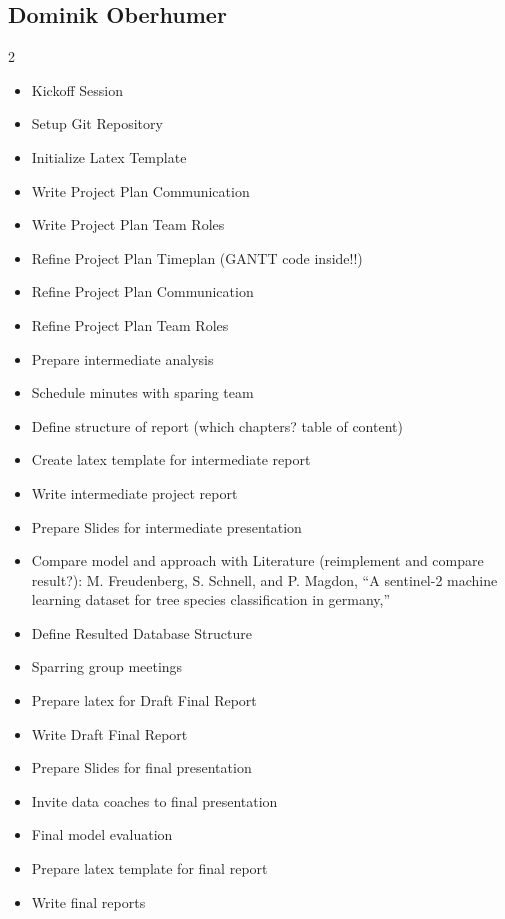 \vspace{-1em}

\subsection*{Dominik Oberhumer}

{\footnotesize
\begin{multicols}{2}
\begin{itemize}[leftmargin=*, nosep]
    \item Kickoff Session
    \item Setup Git Repository
    \item Initialize Latex Template
    \item Write Project Plan Communication
    \item Write Project Plan Team Roles
    \item Refine Project Plan Timeplan (GANTT code inside!!)
    \item Refine Project Plan Communication
    \item Refine Project Plan Team Roles
    \item Prepare intermediate analysis
    \item Schedule minutes with sparing team
    \item Define structure of report (which chapters? table of content)
    \item Create latex template for intermediate report
    \item Write intermediate project report
    \item Prepare Slides for intermediate presentation
    \item Compare model and approach with Literature (reimplement and compare result?): M. Freudenberg, S. Schnell, and P. Magdon, “A sentinel-2 machine learning dataset for tree species classification in germany,”
    \item Define Resulted Database Structure
    \item Sparring group meetings
    \item Prepare latex for Draft Final Report
    \item Write Draft Final Report
    \item Prepare Slides for final presentation
    \item Invite data coaches to final presentation
    \item Final model evaluation
    \item Prepare latex template for final report
    \item Write final reports
\end{itemize}
\end{multicols}
}

